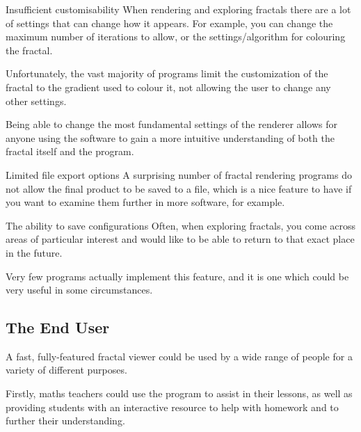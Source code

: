 \begin{greybox}{Insufficient customisability}
	When rendering and exploring fractals there are a lot of settings that can change how it appears. For example, you can change the maximum number of iterations to allow, or the settings/algorithm for colouring the fractal.
	
	\vspace{0.25cm}
	
	Unfortunately, the vast majority of programs limit the customization of the fractal to the gradient used to colour it, not allowing the user to change any other settings.
	
	\vspace{0.25cm}
	
	Being able to change the most fundamental settings of the renderer allows for anyone using the software to gain a more intuitive understanding of both the fractal itself and the program.
\end{greybox}

\begin{greybox}{Limited file export options}
	A surprising number of fractal rendering programs do not allow the final product to be saved to a file, which is a nice feature to have if you want to examine them further in more software, for example.
	
\end{greybox}

\begin{greybox}{The ability to save configurations}
	Often, when exploring fractals, you come across areas of particular interest and would like to be able to return to that exact place in the future.
	
	\vspace{0.25cm}
	
	Very few programs actually implement this feature, and it is one which could be very useful in some circumstances.
\end{greybox}

\vspace{0.25cm}

\subsection{The End User}

A fast, fully-featured fractal viewer could be used by a wide range of people for a variety of different purposes.

Firstly, maths teachers could use the program to assist in their lessons, as well as providing students with an interactive resource to help with homework and to further their understanding.

